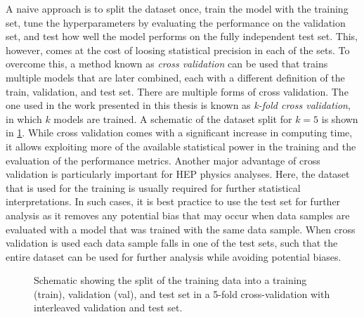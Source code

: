 A naive approach is to split the dataset once, train the model with the training set, tune the hyperparameters by evaluating the performance on the validation set, and test how well the model performs on the fully independent test set. 
This, however, comes at the cost of loosing statistical precision in each of the sets. 
To overcome this, a method known as \emph{cross validation} can be used that trains multiple models that are later combined, each with a different definition of the train, validation, and test set.
There are multiple forms of cross validation. The one used in the work presented in this thesis is known as \emph{k-fold cross validation}, in which $k$ models are trained. A schematic of the dataset split for $k=5$ is shown in \cref{fig:k-fold-method}. 
While cross validation comes with a significant increase in computing time, it allows exploiting more of the available statistical power in the training and the evaluation of the performance metrics.
Another major advantage of cross validation is particularly important for HEP physics analyses. 
Here, the dataset that is used for the training is usually required for further statistical interpretations. In such cases, it is best practice to use the test set for further analysis as it removes any potential bias that may occur when data samples are evaluated with a model that was trained with the same data sample.
When cross validation is used each data sample falls in one of the test sets, such that the entire dataset can be used for further analysis while avoiding potential biases.

\begin{figure}[t]
    \caption{Schematic showing the split of the training data into a training (train), validation (val), and test set in a 5-fold cross-validation with interleaved validation and test set.}
    \label{fig:k-fold-method}
\end{figure}


